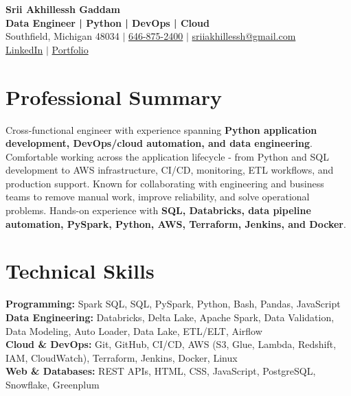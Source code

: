 \documentclass[letterpaper,10pt]{article}
\begin{document}
\fontsize{9.35pt}{10.45pt}\selectfont

\begin{center}
    {\LARGE \textbf{Srii Akhillessh Gaddam}} \\[-1pt]
    \textbf{Data Engineer | Python | DevOps | Cloud} \\[2pt]
    Southfield, Michigan 48034 $|$
    \href{tel:6468752400}{646-875-2400} $|$
    \href{mailto:sriiakhillessh@gmail.com}{sriiakhillessh@gmail.com} \\[1pt]
    \href{https://www.linkedin.com/in/srii-akhiilessh-gaddam-b48668191/}{LinkedIn} $|$
    \href{https://sriiakhillesshg.github.io/portfolio/}{Portfolio}
\end{center}
\vspace{-8pt}

\section{Professional Summary}
\small{Cross-functional engineer with experience spanning \textbf{Python application development, DevOps/cloud automation, and data engineering}. Comfortable working across the application lifecycle - from Python and SQL development to AWS infrastructure, CI/CD, monitoring, ETL workflows, and production support. Known for collaborating with engineering and business teams to remove manual work, improve reliability, and solve operational problems. Hands-on experience with \textbf{SQL, Databricks, data pipeline automation, PySpark, Python, AWS, Terraform, Jenkins, and Docker}.}

\section{Technical Skills}
\small{
\textbf{Programming:} Spark SQL, SQL, PySpark, Python, Bash, Pandas, JavaScript \\
\textbf{Data Engineering:} Databricks, Delta Lake, Apache Spark, Data Validation, Data Modeling, Auto Loader, Data Lake, ETL/ELT, Airflow \\
\textbf{Cloud \& DevOps:} Git, GitHub, CI/CD, AWS (S3, Glue, Lambda, Redshift, IAM, CloudWatch), Terraform, Jenkins, Docker, Linux \\
\textbf{Web \& Databases:} REST APIs, HTML, CSS, JavaScript, PostgreSQL, Snowflake, Greenplum
}
\end{document}
